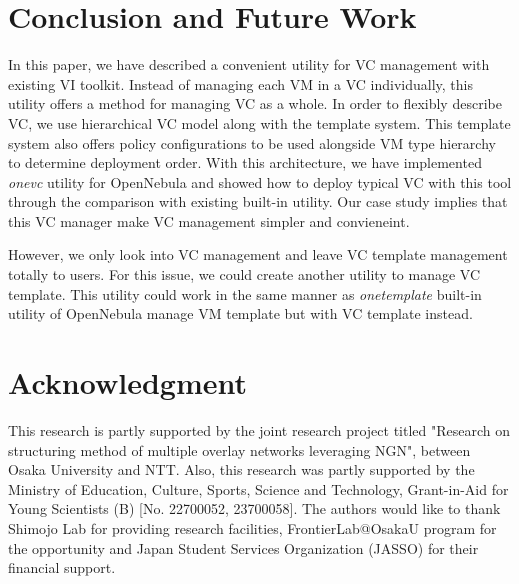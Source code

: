 \documentclass[conference]{IEEEtran}
\begin{document}
\section{Conclusion and Future Work}
In this paper, we have described a convenient utility for VC management with existing VI toolkit.
Instead of managing each VM in a VC individually, this utility offers a method for managing VC as a whole.
In order to flexibly describe VC, we use hierarchical VC model along with the template system.
This template system also offers policy configurations to be used alongside VM type hierarchy to determine deployment order.
With this architecture, we have implemented \emph{onevc} utility for OpenNebula and showed how to deploy typical VC with this tool through the comparison with existing built-in utility.
Our case study implies that this VC manager make VC management simpler and convieneint.

However, we only look into VC management and leave VC template management totally to users.
For this issue, we could create another utility to manage VC template.
This utility could work in the same manner as \emph{onetemplate} built-in utility of OpenNebula manage VM template but with VC template instead.



\section*{Acknowledgment}
This research is partly supported by the joint research project titled "Research on structuring method of multiple overlay networks leveraging NGN", between Osaka University and NTT. Also, this research was partly supported by the Ministry of Education, Culture, Sports, Science and Technology, Grant-in-Aid for Young Scientists (B) [No. 22700052, 23700058].
The authors would like to thank Shimojo Lab for providing research facilities, FrontierLab@OsakaU program for the opportunity and Japan Student Services Organization (JASSO) for their financial support.





\end{document}
